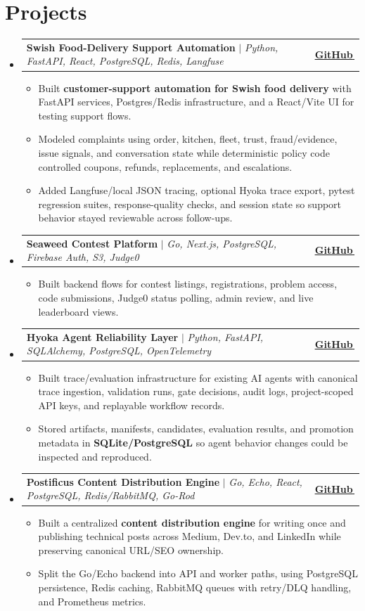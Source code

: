 \documentclass[letterpaper,11pt]{article}
\makeatletter
\newcommand{\bodyhref}[2]{\href{#1}{\underline{#2}\,\faExternalLink*}}
\newcommand{\resumeItem}[1]{\item{\fontsize{8.82pt}{9.28pt}\selectfont #1\vspace{-0.7pt}}}
\newcommand{\resumeProjectHeading}[2]{
    \item
    \begin{tabular*}{1.0\textwidth}{l@{\extracolsep{\fill}}r}
      \small#1 & \textbf{\small #2}\\
    \end{tabular*}\vspace{-4pt}
}
\newcommand{\resumeSubHeadingListStart}{\begin{itemize}[leftmargin=0.0in, label={}, itemsep=0.6pt, topsep=0pt, parsep=0pt, partopsep=0pt]}
\newcommand{\resumeSubHeadingListEnd}{\end{itemize}}
\newcommand{\resumeItemListStart}{\begin{itemize}[leftmargin=0.16in,itemsep=0.3pt,topsep=0.9pt,parsep=0pt,partopsep=0pt]}
\newcommand{\resumeItemListEnd}{\end{itemize}\vspace{-3pt}}
\makeatother
\begin{document}
\section{Projects}
\resumeSubHeadingListStart
\resumeProjectHeading
{\textbf{Swish Food-Delivery Support Automation} $|$ \emph{Python, FastAPI, React, PostgreSQL, Redis, Langfuse}}{\bodyhref{https://github.com/unichronic/swishagent}{GitHub}}
\resumeItemListStart
\resumeItem{Built \textbf{customer-support automation for Swish food delivery} with FastAPI services, Postgres/Redis infrastructure, and a React/Vite UI for testing support flows.}
\resumeItem{Modeled complaints using order, kitchen, fleet, trust, fraud/evidence, issue signals, and conversation state while deterministic policy code controlled coupons, refunds, replacements, and escalations.}
\resumeItem{Added Langfuse/local JSON tracing, optional Hyoka trace export, pytest regression suites, response-quality checks, and session state so support behavior stayed reviewable across follow-ups.}
\resumeItemListEnd
\resumeProjectHeading
{\textbf{Seaweed Contest Platform} $|$ \emph{Go, Next.js, PostgreSQL, Firebase Auth, S3, Judge0}}{\bodyhref{https://github.com/unichronic/seaweed-fe}{GitHub}}
\resumeItemListStart
\resumeItem{Built backend flows for contest listings, registrations, problem access, code submissions, Judge0 status polling, admin review, and live leaderboard views.}
\resumeItemListEnd
\resumeProjectHeading
{\textbf{Hyoka Agent Reliability Layer} $|$ \emph{Python, FastAPI, SQLAlchemy, PostgreSQL, OpenTelemetry}}{\bodyhref{https://github.com/unichronic/hyoka}{GitHub}}
\resumeItemListStart
\resumeItem{Built trace/evaluation infrastructure for existing AI agents with canonical trace ingestion, validation runs, gate decisions, audit logs, project-scoped API keys, and replayable workflow records.}
\resumeItem{Stored artifacts, manifests, candidates, evaluation results, and promotion metadata in \textbf{SQLite/PostgreSQL} so agent behavior changes could be inspected and reproduced.}
\resumeItemListEnd
\resumeProjectHeading
{\textbf{Postificus Content Distribution Engine} $|$ \emph{Go, Echo, React, PostgreSQL, Redis/RabbitMQ, Go-Rod}}{\bodyhref{https://github.com/unichronic/postificus}{GitHub}}
\resumeItemListStart
\resumeItem{Built a centralized \textbf{content distribution engine} for writing once and publishing technical posts across Medium, Dev.to, and LinkedIn while preserving canonical URL/SEO ownership.}
\resumeItem{Split the Go/Echo backend into API and worker paths, using PostgreSQL persistence, Redis caching, RabbitMQ queues with retry/DLQ handling, and Prometheus metrics.}
\resumeItemListEnd
\resumeSubHeadingListEnd
\end{document}
